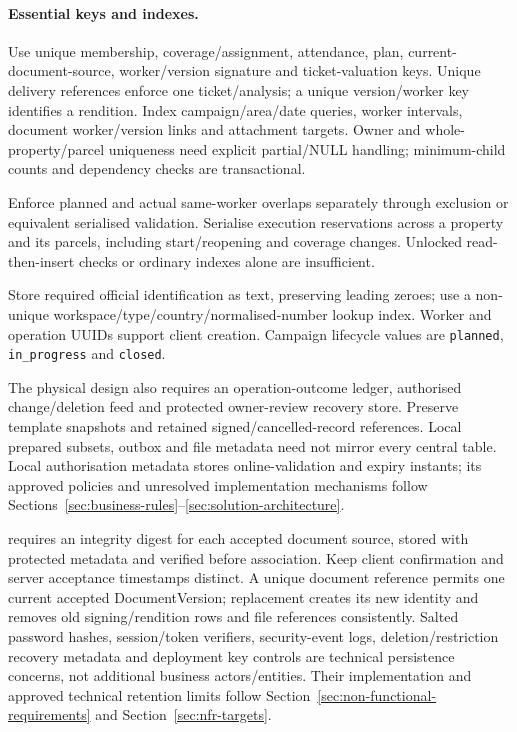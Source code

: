 \paragraph{Essential keys and indexes.}
Use unique membership, coverage/assignment, attendance, plan, current-document-source,
worker/version signature and ticket-valuation keys. Unique delivery references
enforce one ticket/analysis; a unique version/worker key identifies a rendition.
Index campaign/area/date queries, worker intervals, document worker/version links and
attachment targets. Owner and whole-property/parcel uniqueness need explicit
partial/NULL handling; minimum-child counts and dependency checks are transactional.

Enforce planned and actual same-worker overlaps separately through exclusion or
equivalent serialised validation. Serialise execution reservations across a property
and its parcels, including start/reopening and coverage changes. Unlocked
read-then-insert checks or ordinary indexes alone are insufficient.

Store required official identification as text, preserving leading zeroes; use a
non-unique workspace/\allowbreak{}type/\allowbreak{}country/\allowbreak{}normalised-number lookup index. Worker and
operation UUIDs support client creation. Campaign lifecycle values are
\texttt{planned}, \texttt{in\_progress} and \texttt{closed}.

The physical design also requires an operation-outcome ledger, authorised
change/deletion feed and protected owner-review recovery store. Preserve template
snapshots and retained signed/cancelled-record references. Local prepared subsets,
outbox and file metadata need not mirror every central table. Local authorisation
metadata stores online-validation and expiry instants; its approved policies and
unresolved implementation mechanisms follow Sections~\ref{sec:business-rules}--\ref{sec:solution-architecture}.

 requires an integrity digest for each accepted document source, stored with
protected metadata and verified before association. Keep client confirmation and server acceptance timestamps distinct. A unique document reference permits one current accepted DocumentVersion; replacement creates its new identity and removes old signing/rendition rows and file references consistently. Salted password hashes, session/token
verifiers, security-event logs,
deletion/restriction recovery metadata and deployment key controls are technical
persistence concerns, not additional business actors/entities. Their implementation
and approved technical retention limits follow Section~\ref{sec:non-functional-requirements}
and Section~\ref{sec:nfr-targets}.

